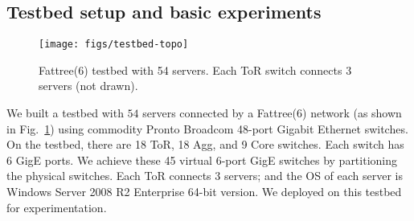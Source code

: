 

\subsection{Testbed setup and basic experiments}\label{subsec:testbed}

\begin{figure}[t]
\centering
\texttt{[image: figs/testbed-topo]}
\vspace{-0.1in}
\caption{Fattree(6) testbed with 54 servers. Each ToR switch connects 3 servers (not drawn).}\label{fig:fattree}
\vspace{-0.1in}
\end{figure}

 We built a testbed with $54$ servers connected by a Fattree(6) network (as shown in Fig.~\ref{fig:fattree}) using commodity Pronto Broadcom 48-port Gigabit Ethernet switches. On the testbed, there are 18 ToR, 18 Agg, and 9 Core switches. Each switch has 6 GigE ports. We achieve these 45 virtual 6-port GigE switches by partitioning the physical switches. Each ToR connects 3 servers; and the OS of each server is Windows Server 2008 R2 Enterprise 64-bit version. We deployed \sys on this testbed for experimentation.

